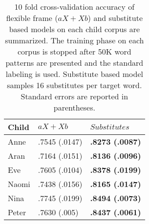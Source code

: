 \begin{table}[ht]
\centering
\caption{10 fold cross-validation accuracy of flexible frame ($aX + Xb$) and
  substitute based models on each child corpus are summarized.
  The training phase on each corpus is stopped after 50K word patterns
  are presented and the standard labeling is used.  Substitute based model
  samples 16 substitutes per target word. Standard errors are
  reported in parentheses.
}


\begin{tabular}{|l|l|l|}
  \hline
  Child & $aX + Xb$ & $Substitutes$\\
  \hline
  Anne  & .7545 (.0147) & {\bf .8273 (.0087)} \\
  Aran  & .7164 (.0151) & {\bf .8136 (.0096)} \\
  Eve   & .7605 (.0104) & {\bf .8378 (.0199)} \\
  Naomi & .7438 (.0156) & {\bf .8165 (.0147)} \\
  Nina  & .7745 (.0199) & {\bf .8494 (.0073)} \\
  Peter & .7630 (.005)  & {\bf .8437 (.0061)} \\
  \hline
\end{tabular}
\label{t:framevssub}
\end{table}


